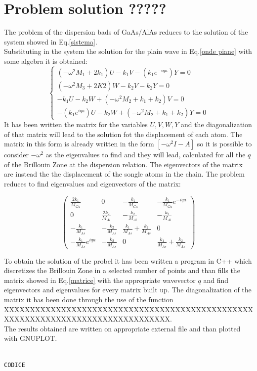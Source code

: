 \documentclass{article}
\begin{document}
\section{Problem solution ?????}
The problem of the dispersion bads of GaAs/AlAs reduces to the solution of the system showed in Eq.\ref{sistema}. \\
Substituting in the system the solution for the plain wave in Eq.\ref{onde piane} with some algebra it is obtained:
\begin{equation}
	\begin{cases}
	(-\omega^2M_1 + 2k_1)U - k_1V - (k_1e^{-iqa})Y = 0 \\
    (-\omega^2M_3 + 2K2)W -k_2V - k_2Y = 0 \\
	-k_1U -k_2W + (-\omega^2M_2 + k_1 + k_2)V = 0 \\
	-(k_1e^{iqa})U - k_2W + (-\omega^2M_2 + k_1 + k_2)Y = 0	
	\end{cases}
	\label{sist.final}
\end{equation}
It has been written the matrix for the variables $U, V, W, Y$ and the diagonalization of that matrix will lead to the solution fot the displacement of each atom. The matrix in this form is already written in the form $[-\omega^2I - A]$ so it is possible to consider $-\omega^2$ as the eigenvalues to find and they will lead, calculated for all the $q$ of the Brillouin Zone at the dispersion relation. The eigenvectors of the matrix are instead the the displacement of the songle atoms in the chain. The problem reduces to find eigenvalues and eigenvectors of the matrix:

\begin{equation} 
\begin{pmatrix}
   \frac{2k_1}{M_{Ga}}	& 0  & -\frac{k_1}{M_{Ga}}  & -\frac{k_1}{M_{Ga}}e^{-iqa}  \\ 
   0	& \frac{2k_2}{M_{Al}}  & -\frac{k_2}{M_{Al}}  & -\frac{k_2}{M_{Al}}  \\ 
   -\frac{k_1}{M_{As}} 	& -\frac{k_2}{M_{As}}   & \frac{k_1}{M_{As}}+\frac{k_2}{M_{As}}   & 0  \\ 
   -\frac{k_1}{M_{As}}e^{iqa} 	& -\frac{k_2}{M_{As}}  & 0  & \frac{k_1}{M_{As}}+\frac{k_2}{M_{As}}   
\end{pmatrix} 
\label{matrice}
\end{equation}

To obtain the solution of the probel it has been written a program in C++ which discretizes the Brillouin Zone in a selected number of points and than fills the matrix showed in Eq.\ref{matrice} with the appropriate wavevector $q$ and find eigenvectors and eigenvalues for every matrix built up. The diagonalization of the matrix it has been done through the use of the function XXXXXXXXXXXXXXXXXXXXXXXXXXXXXXXXXXXXXXXXXXXXXXXXXXXXXXXXXXXXXXXXXXXXXXXXXXXXXXXX. \\
The results obtained are written on appropriate external file and than plotted with GNUPLOT.

\begin{lstlisting}[language=C++, caption={Subroutine norma \\ \emph{maodulo.f90}}]

CODICE

\end{lstlisting} 


	
\end{document}

